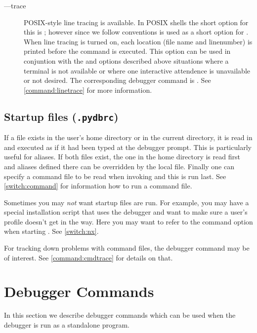 \begin{description}
\item[--{}--trace]\label{switch:trace}

POSIX-style line tracing is available. In POSIX shells the short
option for this is ; however since we follow 
conventions  is used as a short option for
. When line tracing is turned on, each location (file
name and linenumber) is printed before the command is executed. This
option can be used in conjuntion with the  and
 options described above situations where a terminal is
not available or where one interactive attendence is unavailable or
not desired. The corresponding debugger command is . See \ref{command:linetrace} for more information.

\end{description}

\subsection{Startup files ({\tt .pydbrc})\label{subsection:startup-files}}

If a file 
 exists
in the user's home directory or in the current directory, it is read
in and executed as if it had been typed at the debugger prompt.  This
is particularly useful for aliases.  If both files exist, the one in
the home directory is read first and aliases defined there can be
overridden by the local file. Finally one can specify a command file
to be read when invoking  and this is run last. See
\ref{switch:command} for information how to run a command file.

Sometimes you may \emph{not} want startup files are run. For example,
you may have a special installation script that uses the debugger and
want to make sure a user's profile doesn't get in the way. Here you
may want to refer to the  command option when starting
. See \ref{switch:nx}.

For tracking down problems with command files, the  debugger command may be of interest. See
\ref{command:cmdtrace} for details on that.

\section{Debugger Commands \label{command:debuggers}}

In this section we describe debugger commands which can be used when
the debugger is run as a standalone program.

